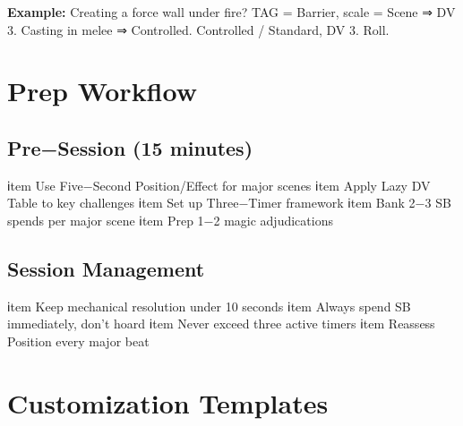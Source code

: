 \textbf{Example:} Creating a force wall under fire? TAG = Barrier, scale = Scene ⇒ DV 3. Casting in melee ⇒ Controlled. Controlled / Standard, DV 3. Roll.

\sectionrule

\section*{Prep Workflow}

\subsection*{Pre−Session (15 minutes)}
\begin{enumerate}
    ℹtem Use Five−Second Position/Effect for major scenes
    ℹtem Apply Lazy DV Table to key challenges
    ℹtem Set up Three−Timer framework
    ℹtem Bank 2−3 SB spends per major scene
    ℹtem Prep 1−2 magic adjudications
\end{enumerate}

\subsection*{Session Management}
\begin{itemize}
    ℹtem Keep mechanical resolution under 10 seconds
    ℹtem Always spend SB immediately, don't hoard
    ℹtem Never exceed three active timers
    ℹtem Reassess Position every major beat
\end{itemize}

\sectionrule

\section*{Customization Templates}

